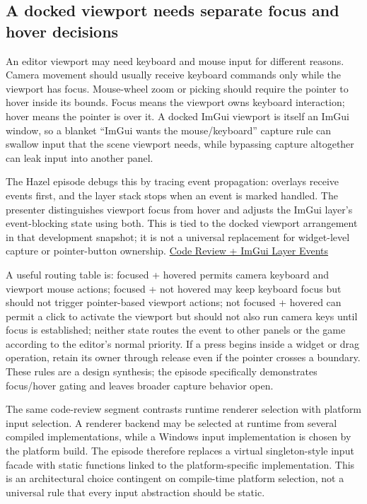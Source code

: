 \subsection{A docked viewport needs separate focus and hover decisions}\label{06-engine-ii-ch032-a-docked-viewport-needs-separate-focus-and-hover-decisions}

An editor viewport may need keyboard and mouse input for different reasons. Camera movement should usually receive keyboard commands only while the viewport has focus. Mouse-wheel zoom or picking should require the pointer to hover inside its bounds. Focus means the viewport owns keyboard interaction; hover means the pointer is over it. A docked ImGui viewport is itself an ImGui window, so a blanket ``ImGui wants the mouse/keyboard'' capture rule can swallow input that the scene viewport needs, while bypassing capture altogether can leak input into another panel.

The Hazel episode debugs this by tracing event propagation: overlays receive events first, and the layer stack stops when an event is marked handled. The presenter distinguishes viewport focus from hover and adjusts the ImGui layer's event-blocking state using both. This is tied to the docked viewport arrangement in that development snapshot; it is not a universal replacement for widget-level capture or pointer-button ownership. \href{https://www.youtube.com/watch?v=ETIhjdVBH-8}{Code Review + ImGui Layer Events}

A useful routing table is: focused + hovered permits camera keyboard and viewport mouse actions; focused + not hovered may keep keyboard focus but should not trigger pointer-based viewport actions; not focused + hovered can permit a click to activate the viewport but should not also run camera keys until focus is established; neither state routes the event to other panels or the game according to the editor's normal priority. If a press begins inside a widget or drag operation, retain its owner through release even if the pointer crosses a boundary. These rules are a design synthesis; the episode specifically demonstrates focus/hover gating and leaves broader capture behavior open.

The same code-review segment contrasts runtime renderer selection with platform input selection. A renderer backend may be selected at runtime from several compiled implementations, while a Windows input implementation is chosen by the platform build. The episode therefore replaces a virtual singleton-style input facade with static functions linked to the platform-specific implementation. This is an architectural choice contingent on compile-time platform selection, not a universal rule that every input abstraction should be static.

